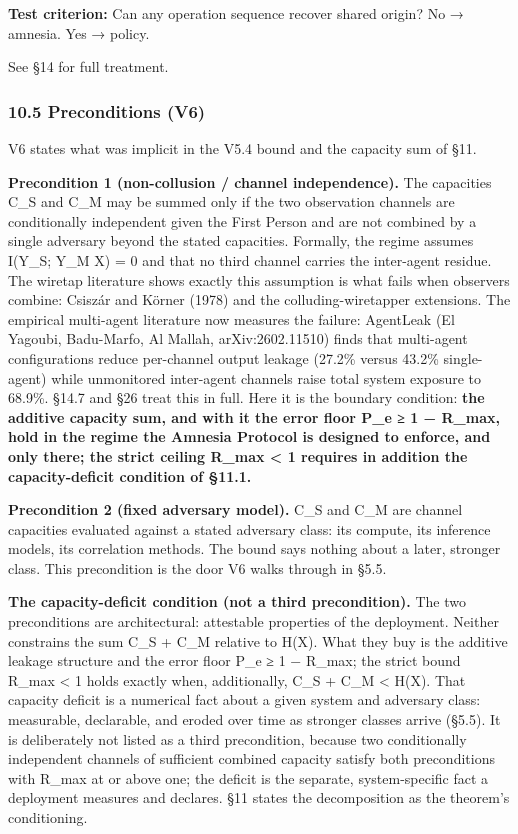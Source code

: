 \documentclass[
]{article}
\begin{document}
\textbf{Test criterion:} Can any operation sequence recover shared
origin? No → amnesia. Yes → policy.

See §14 for full treatment.

\subsubsection{10.5 Preconditions (V6)}\label{preconditions-v6}

V6 states what was implicit in the V5.4 bound and the capacity sum of
§11.

\textbf{Precondition 1 (non-collusion / channel independence).} The
capacities C\_S and C\_M may be summed only if the two observation
channels are conditionally independent given the First Person and are
not combined by a single adversary beyond the stated capacities.
Formally, the regime assumes I(Y\_S; Y\_M \textbar{} X) = 0 and that no
third channel carries the inter-agent residue. The wiretap literature
shows exactly this assumption is what fails when observers combine:
Csiszár and Körner (1978) and the colluding-wiretapper extensions. The
empirical multi-agent literature now measures the failure: AgentLeak (El
Yagoubi, Badu-Marfo, Al Mallah, arXiv:2602.11510) finds that multi-agent
configurations reduce per-channel output leakage (27.2\% versus 43.2\%
single-agent) while unmonitored inter-agent channels raise total system
exposure to 68.9\%. §14.7 and §26 treat this in full. Here it is the
boundary condition: \textbf{the additive capacity sum, and with it the
error floor P\_e ≥ 1 − R\_max, hold in the regime the Amnesia Protocol
is designed to enforce, and only there; the strict ceiling R\_max
\textless{} 1 requires in addition the capacity-deficit condition of
§11.1.}

\textbf{Precondition 2 (fixed adversary model).} C\_S and C\_M are
channel capacities evaluated against a stated adversary class: its
compute, its inference models, its correlation methods. The bound says
nothing about a later, stronger class. This precondition is the door V6
walks through in §5.5.

\textbf{The capacity-deficit condition (not a third precondition).} The
two preconditions are architectural: attestable properties of the
deployment. Neither constrains the sum C\_S + C\_M relative to H(X).
What they buy is the additive leakage structure and the error floor P\_e
≥ 1 − R\_max; the strict bound R\_max \textless{} 1 holds exactly when,
additionally, C\_S + C\_M \textless{} H(X). That capacity deficit is a
numerical fact about a given system and adversary class: measurable,
declarable, and eroded over time as stronger classes arrive (§5.5). It
is deliberately not listed as a third precondition, because two
conditionally independent channels of sufficient combined capacity
satisfy both preconditions with R\_max at or above one; the deficit is
the separate, system-specific fact a deployment measures and declares.
§11 states the decomposition as the theorem's conditioning.
\end{document}
